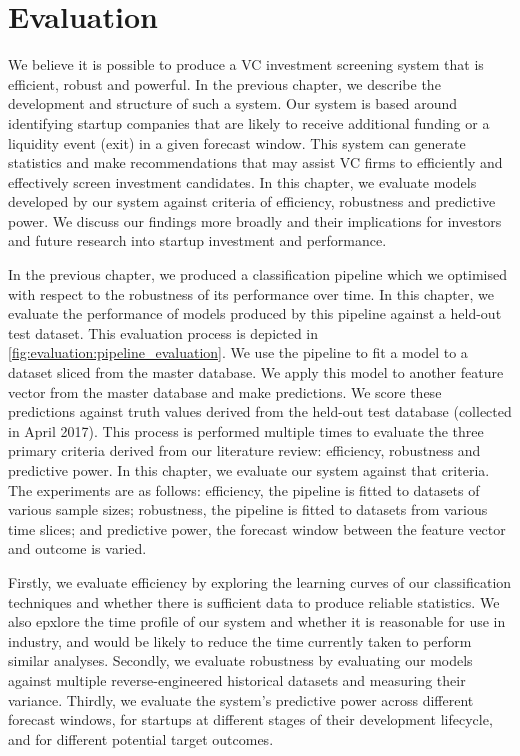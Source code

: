 \documentclass[../thesis/thesis.tex]{subfiles}
\begin{document}
\chapter{Evaluation}
\label{chap:evaluation}

We believe it is possible to produce a VC investment screening system that is efficient, robust and powerful. In the previous chapter, we describe the development and structure of such a system. Our system is based around identifying startup companies that are likely to receive additional funding or a liquidity event (exit) in a given forecast window. This system can generate statistics and make recommendations that may assist VC firms to efficiently and effectively screen investment candidates. In this chapter, we evaluate models developed by our system against criteria of efficiency, robustness and predictive power. We discuss our findings more broadly and their implications for investors and future research into startup investment and performance.

In the previous chapter, we produced a classification pipeline which we optimised with respect to the robustness of its performance over time. In this chapter, we evaluate the performance of models produced by this pipeline against a held-out test dataset. This evaluation process is depicted in \ref{fig:evaluation:pipeline_evaluation}. We use the pipeline to fit a model to a dataset sliced from the master database. We apply this model to another feature vector from the master database and make predictions. We score these predictions against truth values derived from the held-out test database (collected in April 2017). This process is performed multiple times to evaluate the three primary criteria derived from our literature review: efficiency, robustness and predictive power. In this chapter, we evaluate our system against that criteria. The experiments are as follows: efficiency, the pipeline is fitted to datasets of various sample sizes; robustness, the pipeline is fitted to datasets from various time slices; and predictive power, the forecast window between the feature vector and outcome is varied.

Firstly, we evaluate efficiency by exploring the learning curves of our classification techniques and whether there is sufficient data to produce reliable statistics. We also epxlore the time profile of our system and whether it is reasonable for use in industry, and would be likely to reduce the time currently taken to perform similar analyses. Secondly, we evaluate robustness by evaluating our models against multiple reverse-engineered historical datasets and measuring their variance. Thirdly, we evaluate the system's predictive power across different forecast windows,  for startups at different stages of their development lifecycle, and for different potential target outcomes.
\end{document}

